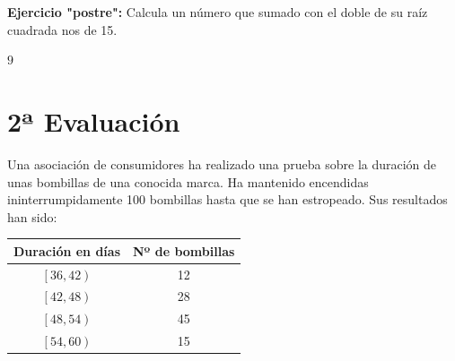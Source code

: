 \documentclass[addpoints,spanish, 12pt,a4paper]{exam}
\begin{document}
\begin{questions}
\begin{multicols}{1}
\begin{parts}
\end{parts}
\end{multicols}
        
        \question[1] \textbf{Ejercicio "postre":} Calcula un número que sumado con el doble de su raíz cuadrada nos de 15.
\addpoints %


\begin{solution}
 	$9$ 
\end{solution}
        


\section*{2ª Evaluación}

\question[1] Una asociación de consumidores ha realizado una prueba sobre la duración de unas bombillas de una conocida marca. Ha mantenido encendidas ininterrumpidamente 100 bombillas  hasta que se han estropeado. Sus resultados han sido:



\begin{tabular}{cc}
\hline
   Duración en días &   Nº de bombillas \\
\hline
     $\left[36, 42\right)$ &     12      \\
     $\left[42, 48\right)$ &     28      \\
     $\left[48, 54\right)$ &     45      \\
     $\left[54, 60\right)$ &     15      \\
\hline
\end{tabular}

\begin{parts}


\end{parts}
\end{questions}
\end{document}

